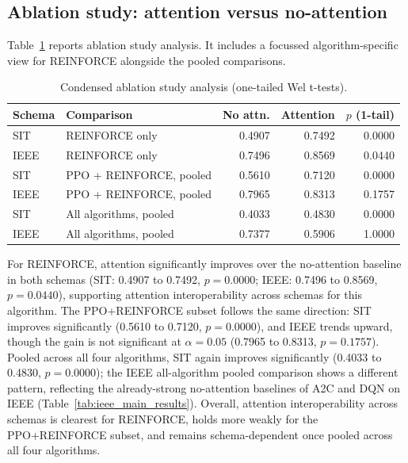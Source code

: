 \documentclass[sn-basic]{sn-jnl}%
\begin{document}
\subsection{Ablation study: attention versus no-attention} \label{sec:ablation_results} %

Table~\ref{tab:ablation_condensed} reports ablation study analysis. It includes a focussed algorithm-specific view for \textsc{REINFORCE} alongside the pooled comparisons.

\begin{table}[htbp]
	\centering
	\caption{Condensed ablation study analysis (one-tailed Wel t-tests).}
	\label{tab:ablation_condensed}
	\begin{tabular}{l l r r r}
		\toprule
		\textbf{Schema} & \textbf{Comparison} & \textbf{No attn.} & \textbf{Attention} & \textbf{$p$ (1-tail)}\\
		\midrule
		SIT & \textsc{REINFORCE} only & 0.4907 & 0.7492 & 0.0000\\
		IEEE & \textsc{REINFORCE} only & 0.7496 & 0.8569 & 0.0440\\
		SIT & PPO + \textsc{REINFORCE}, pooled & 0.5610 & 0.7120 & 0.0000\\
		IEEE & PPO + \textsc{REINFORCE}, pooled & 0.7965 & 0.8313 & 0.1757\\
		SIT & All algorithms, pooled & 0.4033 & 0.4830 & 0.0000\\
		IEEE & All algorithms, pooled & 0.7377 & 0.5906 & 1.0000\\
		\bottomrule
	\end{tabular}
\end{table}

For \textsc{REINFORCE}, attention significantly improves over the no-attention baseline in both schemas (SIT: 0.4907 to 0.7492, $p=0.0000$; IEEE: 0.7496 to 0.8569, $p=0.0440$), supporting attention interoperability across schemas for this algorithm. The PPO+\textsc{REINFORCE} subset follows the same direction: SIT improves significantly (0.5610 to 0.7120, $p=0.0000$), and IEEE trends upward, though the gain is not significant at $\alpha=0.05$ (0.7965 to 0.8313, $p=0.1757$). Pooled across all four algorithms, SIT again improves significantly (0.4033 to 0.4830, $p=0.0000$); the IEEE all-algorithm pooled comparison shows a different pattern, reflecting the already-strong no-attention baselines of \textsc{A2C} and \textsc{DQN} on IEEE (Table~\ref{tab:ieee_main_results}). Overall, attention interoperability across schemas is clearest for \textsc{REINFORCE}, holds more weakly for the PPO+\textsc{REINFORCE} subset, and remains schema-dependent once pooled across all four algorithms.
\end{document}
